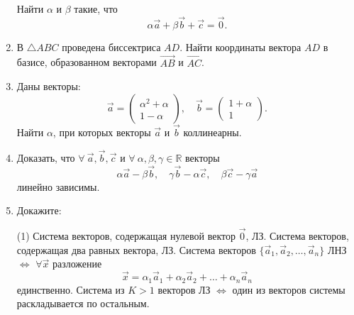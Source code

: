 \begin{enumerate}
	 Найти $\alpha$ и $\beta$ такие, что
	 $$\alpha \vec a + \beta \vec b + \vec c = \vec 0.$$
	 
 	\item В $\triangle ABC$ проведена биссектриса $AD$. Найти координаты вектора $AD$ в базисе, образованном векторами $\overrightarrow{AB}$ и $\overrightarrow{AC}$.

	 
	 \item Даны векторы:
	 $$\vec a = \begin{pmatrix}
	 	\alpha^2+\alpha \\ 1 - \alpha
	 \end{pmatrix},
	 \quad
	 \vec b = 
	 \begin{pmatrix}
	 	1+\alpha \\ 1
	 \end{pmatrix}.$$
	 Найти $\alpha$, при которых векторы $\vec a$ и $\vec b$ коллинеарны.
	 
	 \item Доказать, что $\forall\ {\vec a, \vec b, \vec c}$ и $\forall\ {\alpha, \beta, \gamma} \in \mathbb{R}$ векторы
	 $$\alpha \vec a - \beta \vec b,\quad \gamma \vec b -\alpha \vec c, \quad \beta \vec c - \gamma \vec a$$
	 линейно зависимы.
	 
	\newpage
	\item Докажите:
	\begin{tasks}(1)
		\task Система векторов, содержащая нулевой вектор $\vec 0$, ЛЗ.
		\task Система векторов, содержащая два равных вектора, ЛЗ.  
		\task Система векторов $\{\vec a_1, \vec a_2, \dots, \vec a_n\}$ ЛНЗ $\iff$ $\forall \vec x$ разложение
		$$\vec x = \alpha_1 \vec a_1 + \alpha_2 \vec a_2 + \dots + \alpha_n \vec a_n$$
		единственно. 
		\task Система из $K>1$ векторов ЛЗ $\iff$ один из векторов системы раскладывается по остальным.
	\end{tasks}
\end{enumerate}